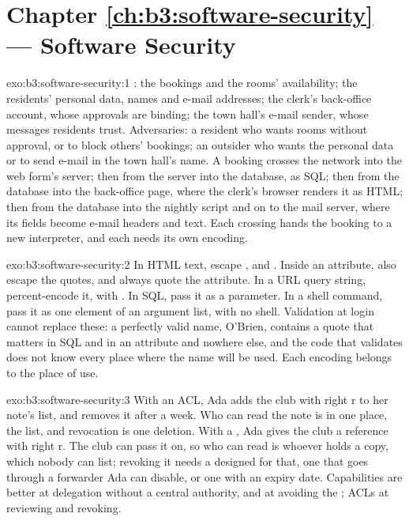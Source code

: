 \section*{Chapter \ref{ch:b3:software-security} --- Software Security}

\begin{solution}{exo:b3:software-security:1}
: the bookings and the rooms' availability; the residents' personal data, names and e-mail addresses; the clerk's back-office account, whose approvals are binding; the town hall's e-mail sender, whose messages residents trust. Adversaries: a resident who wants rooms without approval, or to block others' bookings; an outsider who wants the personal data or to send e-mail in the town hall's name. A booking crosses the network into the web form's server; then from the server into the database, as SQL; then from the database into the back-office page, where the clerk's browser renders it as HTML; then from the database into the nightly script and on to the mail server, where its fields become e-mail headers and text. Each crossing hands the booking to a new interpreter, and each needs its own encoding.
\end{solution}

\begin{solution}{exo:b3:software-security:2}
In HTML text, escape \code{&}, \code{<} and \code{>}. Inside an attribute, also escape the quotes, and always quote the attribute. In a URL query string, percent-encode it, with . In SQL, pass it as a parameter. In a shell command, pass it as one element of an argument list, with no shell. Validation at login cannot replace these: a perfectly valid name, O'Brien, contains a quote that matters in SQL and in an attribute and nowhere else, and the code that validates does not know every place where the name will be used. Each encoding belongs to the place of use.
\end{solution}

\begin{solution}{exo:b3:software-security:3}
With an ACL, Ada adds the club with right r to her note's list, and removes it after a week. Who can read the note is in one place, the list, and revocation is one deletion. With a , Ada gives the club a reference with right r. The club can pass it on, so who can read is whoever holds a copy, which nobody can list; revoking it needs a  designed for that, one that goes through a forwarder Ada can disable, or one with an expiry date. Capabilities are better at delegation without a central authority, and at avoiding the ; ACLs at reviewing and revoking.
\end{solution}

